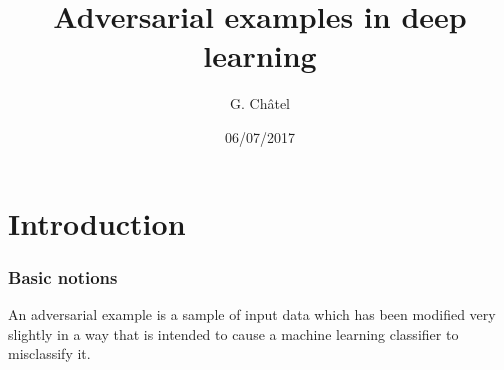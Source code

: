 \documentclass[9pt]{beamer}
\title{Adversarial examples in deep learning}
\author{G. Châtel}
\date{06/07/2017}
\begin{document}
\begin{frame}

  \maketitle

\end{frame}

\begin{frame}

  \tableofcontents

\end{frame}

\section{Introduction}

\begin{frame}
  \frametitle{Basic notions}

  An adversarial example is a sample of input data which has been
  modified very slightly in a way that is intended to cause a machine
  learning classifier to misclassify it.
\end{frame}

\begin{frame}

\end{frame}
\end{document}
